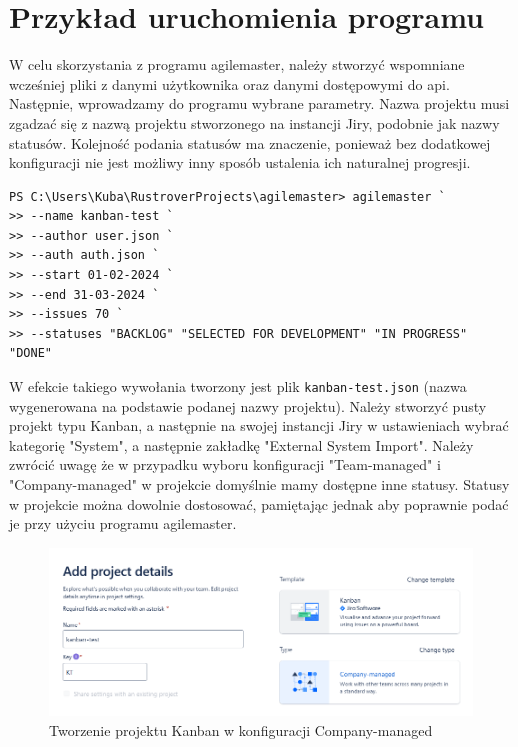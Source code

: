\section{Przykład uruchomienia programu}
W celu skorzystania z programu agilemaster, należy stworzyć wspomniane wcześniej pliki z danymi użytkownika oraz danymi dostępowymi do api.
Następnie, wprowadzamy do programu wybrane parametry. Nazwa projektu musi zgadzać się z nazwą projektu stworzonego na instancji Jiry, podobnie jak nazwy statusów.
Kolejność podania statusów ma znaczenie, ponieważ bez dodatkowej konfiguracji nie jest możliwy inny sposób ustalenia ich naturalnej progresji.
\begin{lstlisting}[caption=Przykładowe użycie programu agilemaster]
PS C:\Users\Kuba\RustroverProjects\agilemaster> agilemaster `
>> --name kanban-test `
>> --author user.json `
>> --auth auth.json `
>> --start 01-02-2024 `
>> --end 31-03-2024 `
>> --issues 70 `
>> --statuses "BACKLOG" "SELECTED FOR DEVELOPMENT" "IN PROGRESS" "DONE"
\end{lstlisting}

W efekcie takiego wywołania tworzony jest plik \texttt{kanban-test.json} (nazwa wygenerowana na podstawie podanej nazwy projektu).
Należy stworzyć pusty projekt typu Kanban, a następnie na swojej instancji Jiry w ustawieniach wybrać kategorię "System", a następnie zakładkę "External System Import".
Należy zwrócić uwagę że w przypadku wyboru konfiguracji "Team-managed" i "Company-managed" w projekcie domyślnie mamy dostępne inne statusy.
Statusy w projekcie można dowolnie dostosować, pamiętając jednak aby poprawnie podać je przy użyciu programu agilemaster.
\begin{figure}[H]
    \centering
    \includegraphics[width=15cm,keepaspectratio]{rysunki/jira-create-project.png}
    \caption{Tworzenie projektu Kanban w konfiguracji Company-managed}
\end{figure}

